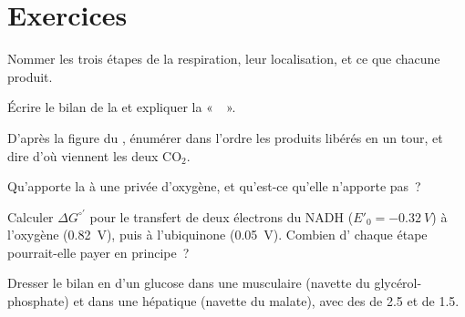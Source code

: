 \section{Exercices}

\begin{exercise}[$\star$]\label{exo:b1:respiration-fermentation:1}
Nommer les trois étapes de la respiration, leur localisation, et ce que
chacune produit.
\end{exercise}

\begin{exercise}[$\star$]\label{exo:b1:respiration-fermentation:2}
Écrire le bilan de la  et expliquer la «~~».
\end{exercise}

\begin{exercise}[$\star$]\label{exo:b1:respiration-fermentation:3}
D'après la figure du , énumérer dans l'ordre les produits
libérés en un tour, et dire d'où viennent les deux $\mathrm{CO_2}$.
\end{exercise}

\begin{exercise}[$\star$]\label{exo:b1:respiration-fermentation:4}
Qu'apporte la  à une  privée d'oxygène, et
qu'est-ce qu'elle n'apporte pas~?
\end{exercise}

\begin{exercise}[$\star\star$]\label{exo:b1:respiration-fermentation:5}
Calculer $\Delta G^{\circ\prime}$ pour le transfert de deux électrons du
NADH ($E'_0 = \qty{-0.32}{V}$) à l'oxygène (\qty{+0.82}{V}), puis à
l'ubiquinone (\qty{+0.05}{V}). Combien d' chaque étape pourrait-elle
payer en principe~?
\end{exercise}

\begin{exercise}[$\star\star$]\label{exo:b1:respiration-fermentation:6}
Dresser le bilan en  d'un glucose dans une  musculaire
(navette du glycérol-phosphate) et dans une  hépatique (navette
du malate), avec des  de 2.5 et de 1.5.
\end{exercise}

